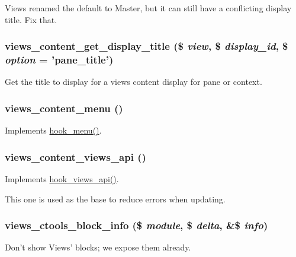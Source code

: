 Views renamed the default to Master, but it can still have a conflicting display title. Fix that. \hypertarget{views__content_8module_afc263b5835dd62ae6774d8720b983a29}{
\subsubsection[{views\_\-content\_\-get\_\-display\_\-title}]{\setlength{\rightskip}{0pt plus 5cm}views\_\-content\_\-get\_\-display\_\-title (\$ {\em view}, \/  \$ {\em display\_\-id}, \/  \$ {\em option} = {\ttfamily 'pane\_\-title'})}}
\label{views__content_8module_afc263b5835dd62ae6774d8720b983a29}
Get the title to display for a views content display for pane or context. \hypertarget{views__content_8module_a8280857d807868e12658b7ce5f582040}{
\subsubsection[{views\_\-content\_\-menu}]{\setlength{\rightskip}{0pt plus 5cm}views\_\-content\_\-menu ()}}
\label{views__content_8module_a8280857d807868e12658b7ce5f582040}
Implements \hyperlink{group__hooks_ga5c95244fea59b25666e409759e133ded}{hook\_\-menu()}. \hypertarget{views__content_8module_a8fd4ad93e1b822d81a655961270cc26b}{
\subsubsection[{views\_\-content\_\-views\_\-api}]{\setlength{\rightskip}{0pt plus 5cm}views\_\-content\_\-views\_\-api ()}}
\label{views__content_8module_a8fd4ad93e1b822d81a655961270cc26b}
Implements \hyperlink{group__views__hooks_gac67ffd4a2f61f9814ee37b541c472c47}{hook\_\-views\_\-api()}.

This one is used as the base to reduce errors when updating. \hypertarget{views__content_8module_af683ec2b8c9e15e7badc8139d5c7f99f}{
\subsubsection[{views\_\-ctools\_\-block\_\-info}]{\setlength{\rightskip}{0pt plus 5cm}views\_\-ctools\_\-block\_\-info (\$ {\em module}, \/  \$ {\em delta}, \/  \&\$ {\em info})}}
\label{views__content_8module_af683ec2b8c9e15e7badc8139d5c7f99f}
Don't show Views' blocks; we expose them already. 